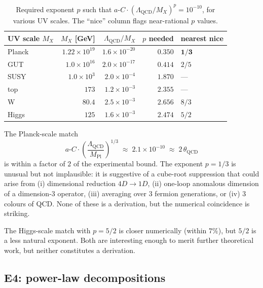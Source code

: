 \documentclass[11pt,a4paper]{article}
\newcommand{\aC}{a\text{-}C}
\newcommand{\LamQ}{\Lambda_{\mathrm{QCD}}}
\newcommand{\MP}{M_{\mathrm{Pl}}}
\theoremstyle{plain}
\theoremstyle{definition}
\theoremstyle{remark}
\begin{document}
\begin{table}[htbp]
\centering
\small
\caption{Required exponent $p$ such that
$\aC\cdot(\LamQ/M_X)^p = 10^{-10}$, for various UV scales.  The
``nice'' column flags near-rational $p$ values.}
\label{tab:scale-bridge}
\begin{tabularx}{\textwidth}{@{}lrrrl@{}}
\toprule
UV scale $M_X$ & $M_X$ [GeV] & $\LamQ/M_X$ & $p$ needed & nearest nice \\
\midrule
Planck   & $1.22\times 10^{19}$ & $1.6\times 10^{-20}$ & $0.350$ & $\mathbf{1/3}$ \\
GUT      & $1.0\times 10^{16}$  & $2.0\times 10^{-17}$ & $0.414$ & $2/5$ \\
SUSY     & $1.0\times 10^{3}$   & $2.0\times 10^{-4}$  & $1.870$ & --- \\
top      & $173$                & $1.2\times 10^{-3}$  & $2.355$ & --- \\
W        & $80.4$               & $2.5\times 10^{-3}$  & $2.656$ & $8/3$ \\
Higgs    & $125$                & $1.6\times 10^{-3}$  & $2.474$ & $5/2$ \\
\bottomrule
\end{tabularx}
\end{table}

\begin{keyfind}
The Planck-scale match
\begin{equation}\label{eq:E3-best}
  \aC \cdot \left(\frac{\LamQ}{\MP}\right)^{1/3}
  \;\approx\; 2.1\times 10^{-10}
  \;\approx\; 2\,\theta_{\mathrm{QCD}}
\end{equation}
is within a factor of $2$ of the experimental bound.  The exponent
$p = 1/3$ is unusual but not implausible: it is suggestive of a
cube-root suppression that could arise from (i) dimensional reduction
$4D\to 1D$, (ii) one-loop anomalous dimension of a dimension-$3$
operator, (iii) averaging over $3$ fermion generations, or (iv)
$3$ colours of QCD.  None of these is a derivation, but the numerical
coincidence is striking.
\end{keyfind}

The Higgs-scale match with $p=5/2$ is closer numerically (within
$7\%$), but $5/2$ is a less natural exponent.  Both are interesting
enough to merit further theoretical work, but neither constitutes a
derivation.

\subsection{E4: power-law decompositions}\label{ssec:E4}
\end{document}

